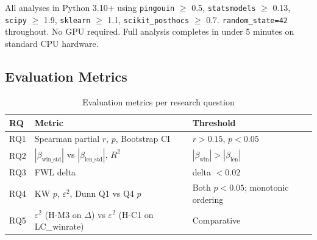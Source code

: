 All analyses in Python 3.10+ using \texttt{pingouin} $\geq$ 0.5, \texttt{statsmodels}
$\geq$ 0.13, \texttt{scipy} $\geq$ 1.9, \texttt{sklearn} $\geq$ 1.1,
\texttt{scikit\_posthocs} $\geq$ 0.7. \texttt{random\_state=42} throughout. No GPU required.
Full analysis completes in under 5 minutes on standard CPU hardware.

\subsection{Evaluation Metrics}

\begin{table}[h]
\centering
\caption{Evaluation metrics per research question}
\label{tab:metrics}
\begin{tabular}{lll}
\toprule
RQ & Metric & Threshold \\
\midrule
RQ1 & Spearman partial $r$, $p$, Bootstrap CI & $r > 0.15$, $p < 0.05$ \\
RQ2 & $|\beta_{\mathrm{win\_std}}|$ vs $|\beta_{\mathrm{len\_std}}|$, $R^2$ & $|\beta_{\mathrm{win}}| > |\beta_{\mathrm{len}}|$ \\
RQ3 & FWL delta & delta $< 0.02$ \\
RQ4 & KW $p$, $\varepsilon^2$, Dunn Q1 vs Q4 $p$ & Both $p < 0.05$; monotonic ordering \\
RQ5 & $\varepsilon^2$ (H-M3 on $\Delta$) vs $\varepsilon^2$ (H-C1 on LC\_winrate) & Comparative \\
\bottomrule
\end{tabular}
\end{table}
